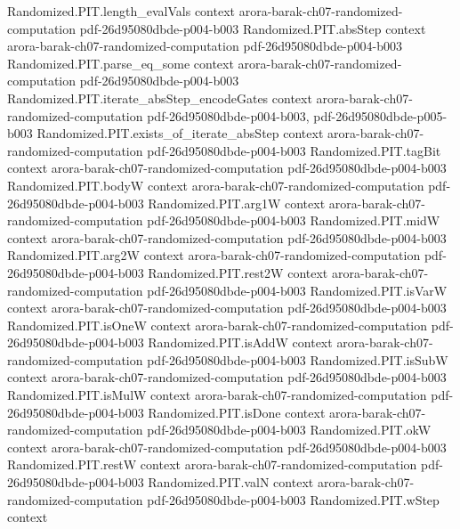 \begin{theorem}
\proofstep
  {Randomized.PIT.length_evalVals}
  {context}
  {arora-barak-ch07-randomized-computation}
  {pdf-26d95080dbde-p004-b003}
\proofstep
  {Randomized.PIT.absStep}
  {context}
  {arora-barak-ch07-randomized-computation}
  {pdf-26d95080dbde-p004-b003}
\proofstep
  {Randomized.PIT.parse_eq_some}
  {context}
  {arora-barak-ch07-randomized-computation}
  {pdf-26d95080dbde-p004-b003}
\proofstep
  {Randomized.PIT.iterate_absStep_encodeGates}
  {context}
  {arora-barak-ch07-randomized-computation}
  {pdf-26d95080dbde-p004-b003,
    pdf-26d95080dbde-p005-b003}
\proofstep
  {Randomized.PIT.exists_of_iterate_absStep}
  {context}
  {arora-barak-ch07-randomized-computation}
  {pdf-26d95080dbde-p004-b003}
\proofstep
  {Randomized.PIT.tagBit}
  {context}
  {arora-barak-ch07-randomized-computation}
  {pdf-26d95080dbde-p004-b003}
\proofstep
  {Randomized.PIT.bodyW}
  {context}
  {arora-barak-ch07-randomized-computation}
  {pdf-26d95080dbde-p004-b003}
\proofstep
  {Randomized.PIT.arg1W}
  {context}
  {arora-barak-ch07-randomized-computation}
  {pdf-26d95080dbde-p004-b003}
\proofstep
  {Randomized.PIT.midW}
  {context}
  {arora-barak-ch07-randomized-computation}
  {pdf-26d95080dbde-p004-b003}
\proofstep
  {Randomized.PIT.arg2W}
  {context}
  {arora-barak-ch07-randomized-computation}
  {pdf-26d95080dbde-p004-b003}
\proofstep
  {Randomized.PIT.rest2W}
  {context}
  {arora-barak-ch07-randomized-computation}
  {pdf-26d95080dbde-p004-b003}
\proofstep
  {Randomized.PIT.isVarW}
  {context}
  {arora-barak-ch07-randomized-computation}
  {pdf-26d95080dbde-p004-b003}
\proofstep
  {Randomized.PIT.isOneW}
  {context}
  {arora-barak-ch07-randomized-computation}
  {pdf-26d95080dbde-p004-b003}
\proofstep
  {Randomized.PIT.isAddW}
  {context}
  {arora-barak-ch07-randomized-computation}
  {pdf-26d95080dbde-p004-b003}
\proofstep
  {Randomized.PIT.isSubW}
  {context}
  {arora-barak-ch07-randomized-computation}
  {pdf-26d95080dbde-p004-b003}
\proofstep
  {Randomized.PIT.isMulW}
  {context}
  {arora-barak-ch07-randomized-computation}
  {pdf-26d95080dbde-p004-b003}
\proofstep
  {Randomized.PIT.isDone}
  {context}
  {arora-barak-ch07-randomized-computation}
  {pdf-26d95080dbde-p004-b003}
\proofstep
  {Randomized.PIT.okW}
  {context}
  {arora-barak-ch07-randomized-computation}
  {pdf-26d95080dbde-p004-b003}
\proofstep
  {Randomized.PIT.restW}
  {context}
  {arora-barak-ch07-randomized-computation}
  {pdf-26d95080dbde-p004-b003}
\proofstep
  {Randomized.PIT.valN}
  {context}
  {arora-barak-ch07-randomized-computation}
  {pdf-26d95080dbde-p004-b003}
\proofstep
  {Randomized.PIT.wStep}
  {context}

\end{theorem}
